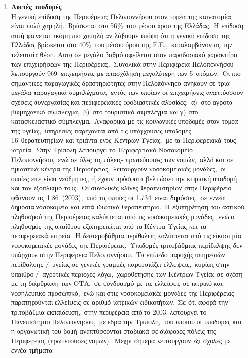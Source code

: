 \documentclass[12pt]{article}
\begin{document}
\begin{enumerate}
		\item \textbf{Λοιπές υποδομές} \\
		Η γενική επίδοση της Περιφέρειας Πελοποννήσου στον τομέα της καινοτομίας είναι πολύ χαμηλή. Βρίσκεται στο 56\% του μέσου όρου της Ελλάδας. Η επίδοση αυτή φαίνεται ακόμη πιο χαμηλή αν λάβουμε υπόψη ότι η γενική επίδοση της Ελλάδας βρίσκεται στο 40\% του μέσου όρου της Ε.Ε., καταλαμβάνοντας την τελευταία θέση. Αυτό σε μεγάλο βαθμό οφείλεται στον παραδοσιακό χαρακτήρα των επιχειρήσεων της Περιφέρειας. Συνολικά στην Περιφέρεια Πελοποννήσου λειτουργούν 909 επιχειρήσεις με απασχόληση μεγαλύτερη των 5 ατόμων. Οι πιο σημαντικές παραγωγικές δραστηριότητες στην Πελοπόννησο ανήκουν σε τρία μεγάλα παραγωγικά συμπλέγματα, εντός των οποίων οι επιχειρήσεις αναπτύσσουν σχέσεις συνεργασίας και περιφερειακές εφοδιαστικές αλυσίδες: α) στο αγροτο-βιομηχανικό σύμπλεγμα, β) στο τουριστικό σύμπλεγμα και γ) στο κατασκευαστικό σύμπλεγμα. Αναφορικά με τις κοινωνικές υποδομές στον τομέα της υγείας, υπηρεσίες παρέχονται από τις υπάρχουσες υποδομές 16 θεραπευτηρίων και τριάντα ενός Κέντρων Υγείας, με τα Περιφερειακά τους ιατρεία. Στην Τρίπολη λειτουργεί το Περιφερειακό Νοσοκομείο Πελοποννήσου, ενώ σε όλες τις πόλεις- πρωτεύουσες των νομών, αλλά και σε ημιαστικά κέντρα της Περιφέρειας, λειτουργούν νοσοκομειακές μονάδες, οι οποίες είτε είναι νεόδμητες, ή έχουν πρόσφατα βελτιώσει την κτιριακή υποδομή και τον εξοπλισμό τους. Οι συνολικές κλίνες θεραπευτηρίων στην Περιφέρεια φθάνουν τις 1.86 (2003), από τις οποίες οι 1.734 είναι δημόσιες, σε εννέα δημόσια νοσοκομεία και επτά ιδιωτικά θεραπευτήρια. Η εξυπηρέτηση του αστικού πληθυσμού της Περιφέρειας καλύπτεται από τις νοσοκομειακές μονάδες, ενώ ο πληθυσμός της υπαίθρου εξυπηρετείται από τα Κέντρα Υγείας και τα περιφερειακά ιατρεία. Η δευτεροβάθμια περίθαλψη καλύπτεται από τις είκοσι μία νοσοκομειακές μονάδες της Περιφέρειας. Υποδομές τριτοβάθμιας περίθαλψης δεν υπάρχουν στην Περιφέρεια Πελοποννήσου. Το επίπεδο παροχής υπηρεσιών περίθαλψης / υγείας σε γενικές γραμμές παρουσιάζει ελλείψεις, κυρίως στην ύπαιθρο / αγροτικές περιοχές λόγω, χωροθέτησης των Κέντρων Υγείας σε σχέση με τη διάρθρωση των ΟΤΑ, σε συνδυασμό με τις ελλείψεις σε ιατρικό και νοσηλευτικό προσωπικό, ενώ και στις νοσοκομειακές μονάδες της Περιφέρειας παρατηρούνται ελλείψεις σε αριθμό ιατρικών ειδικοτήτων. Σε ότι αφορά την τριτοβάθμια εκπαίδευση, στην περιφέρεια από το 2003 λειτουργεί το Πανεπιστήμιο Πελοποννήσου, με έδρα την Τρίπολη, του οποίου οι υποδομές και η οργανωτική του δομή αναπτύσσονται σταδιακά σε διάφορες πόλεις της Περιφέρειας (πρωτεύουσες νομών). Μέχρι σήμερα λειτουργούν έξι σχολές με εννέα τμήματα.
	\end{enumerate}
\end{document}
